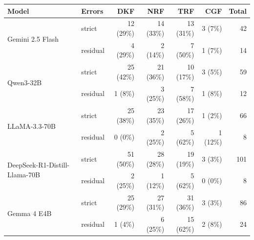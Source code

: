 \begin{tabular}{llrrrrr}
\toprule
\textbf{Model} & \textbf{Errors} & \textbf{DKF} & \textbf{NRF} & \textbf{TRF} & \textbf{CGF} & \textbf{Total} \\
\midrule
\multirow{2}{*}{Gemini 2.5 Flash} & strict & 12 (29\%) & 14 (33\%) & 13 (31\%) & 3 (7\%) & 42 \\
 & residual & 4 (29\%) & 2 (14\%) & 7 (50\%) & 1 (7\%) & 14 \\
\multirow{2}{*}{Qwen3-32B} & strict & 25 (42\%) & 21 (36\%) & 10 (17\%) & 3 (5\%) & 59 \\
 & residual & 1 (8\%) & 3 (25\%) & 7 (58\%) & 1 (8\%) & 12 \\
\multirow{2}{*}{LLaMA-3.3-70B} & strict & 25 (38\%) & 23 (35\%) & 17 (26\%) & 1 (2\%) & 66 \\
 & residual & 0 (0\%) & 2 (25\%) & 5 (62\%) & 1 (12\%) & 8 \\
\multirow{2}{*}{DeepSeek-R1-Distill-Llama-70B} & strict & 51 (50\%) & 28 (28\%) & 19 (19\%) & 3 (3\%) & 101 \\
 & residual & 2 (25\%) & 1 (12\%) & 5 (62\%) & 0 (0\%) & 8 \\
\multirow{2}{*}{Gemma 4 E4B} & strict & 25 (29\%) & 27 (31\%) & 31 (36\%) & 3 (3\%) & 86 \\
 & residual & 1 (4\%) & 6 (25\%) & 15 (62\%) & 2 (8\%) & 24 \\
\bottomrule
\end{tabular}

